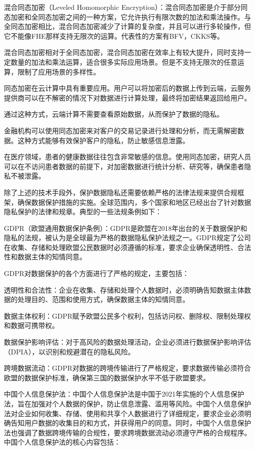 混合同态加密（Leveled Homomorphic Encryption）：混合同态加密是介于部分同态加密和全同态加密之间的一种方案，它允许执行有限次数的加法和乘法操作。与全同态加密相比，混合同态加密减少了计算的复杂度，并且可以进行多轮操作，但它不能像FHE那样支持无限次的运算。代表性的方案有BFV，CKKS等。

混合同态加密相对于全同态加密，混合同态加密在效率上有较大提升，同时支持一定数量的加法和乘法运算，适合很多实际应用场景。但是不支持无限次的任意运算，限制了应用场景的多样性。

同态加密在云计算中具有重要应用。用户可以将加密后的数据上传到云端，云服务提供商可以在不解密的情况下对数据进行计算处理，最终将加密结果返回给用户。

通过这种方式，云端计算不需要查看原始数据，从而保护了数据的隐私。

金融机构可以使用同态加密来对客户的交易记录进行处理和分析，而无需解密数据。这种方式能够有效保护客户的隐私，防止敏感信息泄露。

在医疗领域，患者的健康数据往往包含非常敏感的信息。使用同态加密，研究人员可以在不访问患者数据的前提下，对加密数据进行统计分析、研究等，确保患者隐私不被泄露。

除了上述的技术手段外，保护数据隐私还需要依赖严格的法律法规来提供合规框架，确保数据保护措施的实施。全球范围内，多个国家和地区已经出台了针对数据隐私保护的法律和规章。典型的一些法规条例如下：

GDPR（欧盟通用数据保护条例）：GDPR是欧盟在2018年出台的关于数据保护和隐私的法规，被认为是全球最为严格的数据隐私保护法规之一。GDPR规定了公司在收集、存储和处理欧盟公民数据时必须遵循的标准，要求企业确保透明性、合法性和数据主体的知情同意。

GDPR对数据保护的各个方面进行了严格的规定，主要包括：

透明性和合法性：企业在收集、存储和处理个人数据时，必须明确告知数据主体数据的处理目的、范围和使用方式，确保数据主体的知情同意。

数据主体权利：GDPR赋予欧盟公民多个权利，包括访问权、删除权、限制处理权和数据可携带权。

数据保护影响评估：对于高风险的数据处理活动，企业必须进行数据保护影响评估（DPIA），以识别和规避潜在的隐私风险。

跨境数据流动：GDPR对数据的跨境传输进行了严格规定，要求数据传输必须符合欧盟的数据保护标准，确保第三国的数据保护水平不低于欧盟要求。

中国个人信息保护法：中国个人信息保护法是中国于2021年实施的个人信息保护法，旨在加强对个人数据的保护，防止信息泄露、滥用等风险。中国个人信息保护法对企业如何收集、存储、使用和共享个人数据进行了详细规定，要求企业必须明确告知用户数据的收集目的和方式，并获得用户的同意。同时，中国个人信息保护法也强调了数据跨境传输的合规性，要求跨境数据流动必须遵守严格的合规程序。
中国个人信息保护法的核心内容包括：

